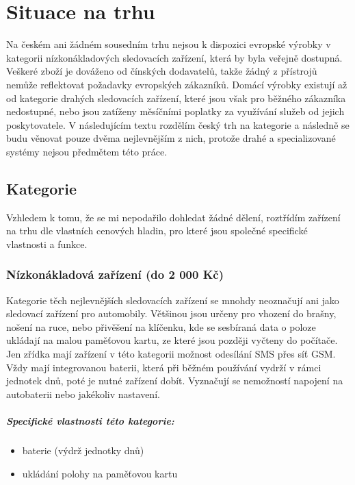 \documentclass[FM,MP]{tulthesis}  %
\begin{document}
\chapter{Situace na trhu}
Na českém ani žádném sousedním trhu nejsou k dispozici evropské výrobky v kategorii nízkonákladových sledovacích zařízení, která by byla veřejně dostupná. Veškeré zboží je dováženo od čínských dodavatelů, takže žádný z přístrojů nemůže reflektovat požadavky evropských zákazníků. Domácí výrobky existují až od kategorie drahých sledovacích zařízení, které jsou však pro běžného zákazníka nedostupné, nebo jsou zatíženy měsíčními poplatky za využívání služeb od jejich poskytovatele. V následujícím textu rozdělím český trh na kategorie a následně se budu věnovat pouze dvěma nejlevnějším z nich, protože drahé a specializované systémy nejsou předmětem této práce.

\section{Kategorie}
Vzhledem k tomu, že se mi nepodařilo dohledat žádné dělení, roztřídím zařízení na trhu dle vlastních cenových hladin, pro které jsou společné specifické vlastnosti a funkce.

\subsection{Nízkonákladová zařízení (do 2 000 Kč)}
Kategorie těch nejlevnějších sledovacích zařízení se mnohdy neoznačují ani jako sledovací zařízení pro automobily. Většinou jsou určeny pro vhození do brašny, nošení na ruce, nebo přivěšení na klíčenku, kde se sesbíraná data o poloze ukládají na malou paměťovou kartu, ze které jsou později vyčteny do počítače. Jen zřídka mají zařízení v této kategorii možnost odesílání SMS přes síť GSM. Vždy mají integrovanou baterii, která při běžném používání vydrží v rámci jednotek dnů, poté je nutné zařízení dobít. Vyznačují se nemožností napojení na autobaterii nebo jakékoliv nastavení.

\paragraph{Specifické vlastnosti této kategorie:}
\begin{itemize}
\item baterie (výdrž jednotky dnů)
\item ukládání polohy na paměťovou kartu
\end{itemize}
\end{document}
